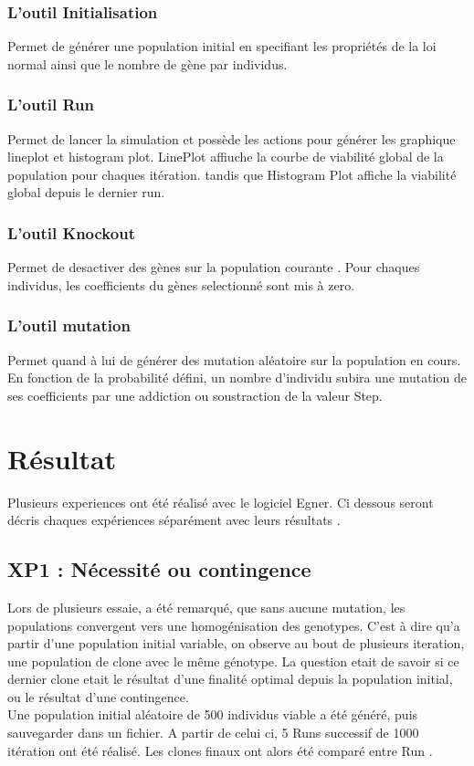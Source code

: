 \documentclass{article}
\begin{document}
	\subsubsection {L'outil Initialisation}
	Permet de générer une population initial en specifiant les propriétés de la loi normal ainsi que le nombre de gène par individus.
	\subsubsection{ L'outil Run}
	Permet de lancer la simulation et possède les actions pour générer les graphique lineplot et histogram plot. LinePlot affiuche la courbe de viabilité global de la population pour chaques itération. tandis que Histogram Plot affiche la viabilité global depuis le dernier run. 
	\subsubsection{L'outil Knockout}
	Permet de desactiver des gènes sur la population courante . Pour chaques individus, les coefficients du gènes selectionné sont mis à zero. 
	\subsubsection{L'outil mutation}
	Permet quand à lui de générer des mutation aléatoire sur la population en cours. En fonction de la probabilité défini, un nombre d'individu subira une mutation de ses coefficients par une addiction ou soustraction de la valeur Step.

	


	\section {Résultat}
	Plusieurs experiences ont été réalisé avec le logiciel Egner. Ci dessous seront décris chaques expériences séparément avec leurs résultats .

	\subsection{XP1 : Nécessité ou contingence}
	Lors de plusieurs essaie, a été remarqué, que sans aucune mutation, les populations convergent vers une homogénisation des genotypes. C'est à dire qu'a partir d'une population initial variable, on observe au bout de plusieurs iteration, une population de clone avec le même génotype. La question etait de savoir si ce dernier clone etait le résultat d'une finalité optimal depuis la population initial, ou le résultat d'une contingence. \\
	Une population initial aléatoire de 500 individus viable a   été généré, puis sauvegarder dans un fichier. A partir de celui ci, 5 Runs successif de 1000 itération ont été réalisé. Les clones finaux ont alors été comparé entre Run . 
\end{document}
